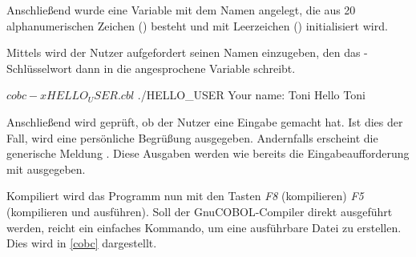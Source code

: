 Anschließend wurde eine Variable mit dem Namen  angelegt, die aus 20 alphanumerischen Zeichen () besteht und mit Leerzeichen () initialisiert wird.

Mittels  wird der Nutzer aufgefordert seinen Namen einzugeben, den das -Schlüsselwort dann in die angesprochene Variable schreibt.

\begin{shellwindow}
$ cobc -x HELLO_USER.cbl
$ ./HELLO_USER
Your name: Toni
Hello Toni
\end{shellwindow}

Anschließend wird geprüft, ob der Nutzer eine Eingabe gemacht hat. Ist dies der Fall, wird eine persönliche Begrüßung ausgegeben. Andernfalls erscheint die generische Meldung . Diese Ausgaben werden wie bereits die Eingabeaufforderung mit  ausgegeben.

Kompiliert wird das Programm nun mit den Tasten \textit{F8} (kompilieren) \bzw \textit{F5} (kompilieren und ausführen). Soll der GnuCOBOL-Compiler direkt ausgeführt werden, reicht ein einfaches Kommando, um eine ausführbare Datei zu erstellen. Dies wird in \autoref{cobc} dargestellt.
